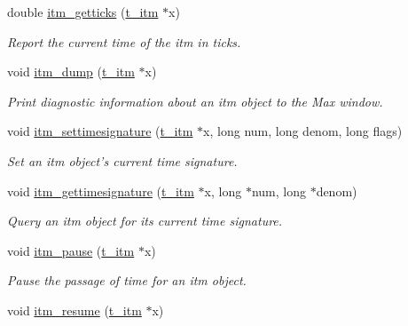 \begin{DoxyCompactItemize}
double \hyperlink{group__time_gafc0e353837687e59fb54bb83ed33768f}{itm\_\-getticks} (\hyperlink{group__time_gac656fa1f920c69cf77e6631bcec53077}{t\_\-itm} $\ast$x)
\begin{DoxyCompactList}\small\item\em Report the current time of the itm in ticks. \item\end{DoxyCompactList}\item 
void \hyperlink{group__time_gab8fb2f5156bb6df433d509d721a8cefd}{itm\_\-dump} (\hyperlink{group__time_gac656fa1f920c69cf77e6631bcec53077}{t\_\-itm} $\ast$x)
\begin{DoxyCompactList}\small\item\em Print diagnostic information about an itm object to the Max window. \item\end{DoxyCompactList}\item 
void \hyperlink{group__time_gad8584c381f8f183ff6eaa0f4e4a4923a}{itm\_\-settimesignature} (\hyperlink{group__time_gac656fa1f920c69cf77e6631bcec53077}{t\_\-itm} $\ast$x, long num, long denom, long flags)
\begin{DoxyCompactList}\small\item\em Set an itm object's current time signature. \item\end{DoxyCompactList}\item 
void \hyperlink{group__time_ga7ced567aa268c709daf2152503de8832}{itm\_\-gettimesignature} (\hyperlink{group__time_gac656fa1f920c69cf77e6631bcec53077}{t\_\-itm} $\ast$x, long $\ast$num, long $\ast$denom)
\begin{DoxyCompactList}\small\item\em Query an itm object for its current time signature. \item\end{DoxyCompactList}\item 
void \hyperlink{group__time_ga844cd45c507bf4c89b91f2c2713fb128}{itm\_\-pause} (\hyperlink{group__time_gac656fa1f920c69cf77e6631bcec53077}{t\_\-itm} $\ast$x)
\begin{DoxyCompactList}\small\item\em Pause the passage of time for an itm object. \item\end{DoxyCompactList}\item 
void \hyperlink{group__time_ga1f3b1dded32c2fcbd955adb094c81d98}{itm\_\-resume} (\hyperlink{group__time_gac656fa1f920c69cf77e6631bcec53077}{t\_\-itm} $\ast$x)

\end{DoxyCompactItemize}
